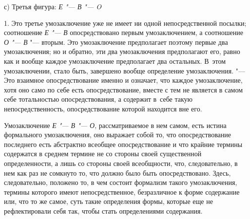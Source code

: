 {с) Третья фигура: {\em Е "--- В "--- O}}

1. Это третье умозаключение уже не имеет ни одной
непосредственной посылки; соотношение {\em Е "--- В}
опосредствовано первым умозаключением, а соотношение
{\em О "--- В} "--- вторым. Это умозаключение предполагает поэтому первые два
умозаключения; но и обратно, эти два умозаключения предполагают его, равно
как и вообще каждое умозаключение предполагает два остальных. В~этом
умозаключении, стало быть, завершено вообще определение умозаключения.
"--- Это взаимное опосредствование именно и означает, что каждое
умозаключение, хотя оно само по себе есть опосредствование, вместе с тем не
является в самом себе тотальностью опосредствования, а содержит в~себе
такую непосредственность, опосредствование которой находится вне его.

Умозаключение {\em Е "--- В "--- О}, рассматриваемое в нем
самом, есть истина формального умозаключения, оно выражает собой то, что
опосредствование последнего есть абстрактно всеобщее опосредствование и что
крайние термины содержатся в среднем термине не со стороны своей
существенной определенности, а лишь со стороны своей всеобщности, что,
следовательно, в нем как раз не сомкнуто то, что должно было быть
опосредствовано. Здесь, следовательно, положено то, в чем состоит формализм
такого умозаключения, термины которого имеют
непосредственное, безразличное к форме содержание или, что то же самое,
суть такие определения формы, которые еще не рефлектировали себя так, чтобы
стать определениями содержания.

